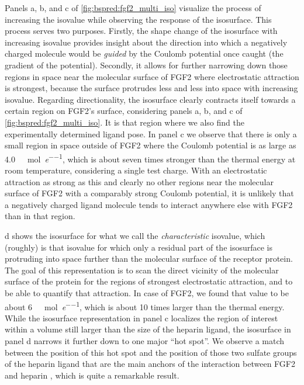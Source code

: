 Panels a, b, and c of \cref{fig:bspred:fgf2_multi_iso} visualize the process of
increasing the isovalue while observing the response of the isosurface. This
process serves two purposes. Firstly, the shape change of the isosurface with
increasing isovalue provides insight about the direction into which a negatively
charged molecule would be \textit{guided} by the Coulomb potential once caught
(the gradient of the potential). Secondly, it allows for further narrowing down
those regions in space near the molecular surface of FGF2 where electrostatic
attraction is strongest, because the surface protrudes less and less into space
with increasing isovalue. Regarding directionality, the isosurface clearly
contracts itself towards a certain region on FGF2's surface, considering panels
a, b, and c of \cref{fig:bspred:fgf2_multi_iso}. It is that region where we also
find the experimentally determined ligand pose. In panel c we observe that there
is only a small region in space outside of FGF2 where the Coulomb potential is
as large as
\SI{4.0}{\kilo\calory\per\mole\per\elementarycharge}, which is about seven times
stronger than the thermal energy at room temperature, considering a single test
charge. With an electrostatic attraction as strong as this and clearly no other
regions near the molecular surface of FGF2 with a comparably strong Coulomb
potential, it is unlikely that a negatively charged ligand molecule tends to
interact anywhere else with FGF2 than in that region.

d shows the isosurface for what we call the
\textit{characteristic} isovalue, which (roughly) is that isovalue for which
only a residual part of the isosurface is protruding into space further than the
molecular surface of the receptor protein. The goal of this representation is to
scan the direct vicinity of the molecular surface of the protein for the regions
of strongest electrostatic attraction, and to be able to quantify that
attraction. In case of FGF2, we found that value to be about
\SI{6}{\kilo\calory\per\mole\per\elementarycharge}, which is about 10 times
larger than the thermal energy. While the isosurface representation in panel c
localizes the region of interest within a volume still larger than the size of
the heparin ligand, the isosurface in panel d narrows it further down to one
major \enquote{hot spot}. We observe a match between the position of this hot
spot and the position of those two sulfate groups of the heparin ligand that are
the main anchors of the interaction between FGF2 and heparin
\cite{faham_heparin_1996}, which is quite a remarkable result.



